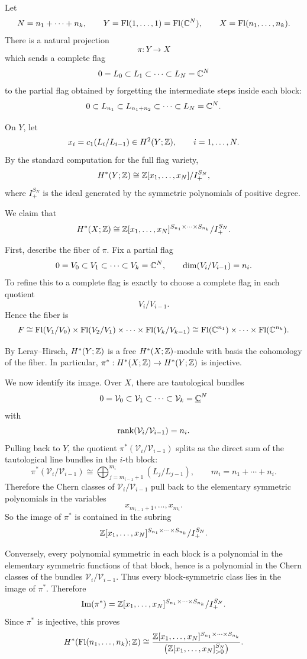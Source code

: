\documentclass[12pt]{article}  %
\begin{document}
\begin{solution}
Let
\[
N=n_1+\cdots+n_k,
\qquad
Y=\operatorname{Fl}(1,\dots,1)=\operatorname{Fl}(\mathbb{C}^N),
\qquad
X=\operatorname{Fl}(n_1,\dots,n_k).
\]
There is a natural projection
\[
\pi:Y\to X
\]
which sends a complete flag
\[
0=L_0\subset L_1\subset\cdots\subset L_N=\mathbb{C}^N
\]
to the partial flag obtained by forgetting the intermediate steps inside each block:
\[
0\subset L_{n_1}\subset L_{n_1+n_2}\subset\cdots\subset L_N=\mathbb{C}^N.
\]

On \(Y\), let
\[
x_i=c_1(L_i/L_{i-1})\in H^2(Y;\mathbb{Z}),\qquad i=1,\dots,N.
\]
By the standard computation for the full flag variety,
\[
H^*(Y;\mathbb{Z})\cong \mathbb{Z}[x_1,\dots,x_N]/I_+^{S_N},
\]
where \(I_+^{S_N}\) is the ideal generated by the symmetric polynomials of positive degree.

We claim that
\[
H^*(X;\mathbb{Z})\cong
\mathbb{Z}[x_1,\dots,x_N]^{S_{n_1}\times\cdots\times S_{n_k}}/I_+^{S_N}.
\]

\medskip

First, describe the fiber of \(\pi\). Fix a partial flag
\[
0=V_0\subset V_1\subset\cdots\subset V_k=\mathbb{C}^N,
\qquad
\dim(V_i/V_{i-1})=n_i.
\]
To refine this to a complete flag is exactly to choose a complete flag in each quotient
\[
V_i/V_{i-1}.
\]
Hence the fiber is
\[
F\cong \operatorname{Fl}(V_1/V_0)\times\operatorname{Fl}(V_2/V_1)\times\cdots\times \operatorname{Fl}(V_k/V_{k-1})
\cong \operatorname{Fl}(\mathbb{C}^{n_1})\times\cdots\times \operatorname{Fl}(\mathbb{C}^{n_k}).
\]

By Leray--Hirsch, \(H^*(Y;\mathbb{Z})\) is a free \(H^*(X;\mathbb{Z})\)-module with basis the cohomology of the fiber. In particular, \(\pi^*:H^*(X;\mathbb{Z})\to H^*(Y;\mathbb{Z})\) is injective.

We now identify its image. Over \(X\), there are tautological bundles
\[
0=\mathcal V_0\subset \mathcal V_1\subset\cdots\subset \mathcal V_k=\underline{\mathbb{C}}^N
\]
with
\[
\operatorname{rank}(\mathcal V_i/\mathcal V_{i-1})=n_i.
\]
Pulling back to \(Y\), the quotient \(\pi^*(\mathcal V_i/\mathcal V_{i-1})\) splits as the direct sum of the tautological line bundles in the \(i\)-th block:
\[
\pi^*(\mathcal V_i/\mathcal V_{i-1})
\cong
\bigoplus_{j=m_{i-1}+1}^{m_i} (L_j/L_{j-1}),
\qquad
m_i=n_1+\cdots+n_i.
\]
Therefore the Chern classes of \(\mathcal V_i/\mathcal V_{i-1}\) pull back to the elementary symmetric polynomials in the variables
\[
x_{m_{i-1}+1},\dots,x_{m_i}.
\]
So the image of \(\pi^*\) is contained in the subring
\[
\mathbb{Z}[x_1,\dots,x_N]^{S_{n_1}\times\cdots\times S_{n_k}}/I_+^{S_N}.
\]

Conversely, every polynomial symmetric in each block is a polynomial in the elementary symmetric functions of that block, hence is a polynomial in the Chern classes of the bundles \(\mathcal V_i/\mathcal V_{i-1}\). Thus every block-symmetric class lies in the image of \(\pi^*\). Therefore
\[
\operatorname{Im}(\pi^*)
=
\mathbb{Z}[x_1,\dots,x_N]^{S_{n_1}\times\cdots\times S_{n_k}}/I_+^{S_N}.
\]
Since \(\pi^*\) is injective, this proves
\[
H^*(\operatorname{Fl}(n_1,\dots,n_k);\mathbb{Z})
\cong
\frac{\mathbb{Z}[x_1,\dots,x_N]^{S_{n_1}\times\cdots\times S_{n_k}}}{\bigl(\mathbb{Z}[x_1,\dots,x_N]^{S_N}_{>0}\bigr)}.
\]


\end{solution}
\end{document}
